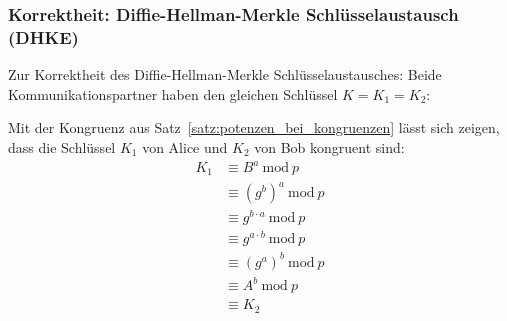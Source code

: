 \documentclass[
  a4paper,
  11pt,
]{scrartcl}
\theoremstyle{plain}
\theoremstyle{definition}
\theoremstyle{remark}
\newcommand{\Mod}[1]{\ \mathrm{mod}\ #1}
\begin{document}
\subsubsection{Korrektheit: Diffie-Hellman-Merkle Schlüsselaustausch (DHKE)}
\label{sub:dhke_proof}
Zur Korrektheit des Diffie-Hellman-Merkle Schlüsselaustausches: Beide
Kommunikationspartner haben den gleichen Schlüssel $K = K_1 = K_2$:

Mit der Kongruenz aus Satz~\ref{satz:potenzen_bei_kongruenzen} lässt sich
zeigen, dass die Schlüssel $K_1$ von Alice und $K_2$ von Bob kongruent sind:
\begin{align*}
  K_1 & \equiv B^a \Mod{p}\\
  & \equiv {(g^b)}^a \Mod{p}\\
  & \equiv g^{b \cdot a} \Mod{p}\\
  & \equiv g^{a \cdot b} \Mod{p}\\
  & \equiv {(g^a)}^b \Mod{p}\\
  & \equiv A^b \Mod{p}\\
  & \equiv K_2
\end{align*}
\end{document}
